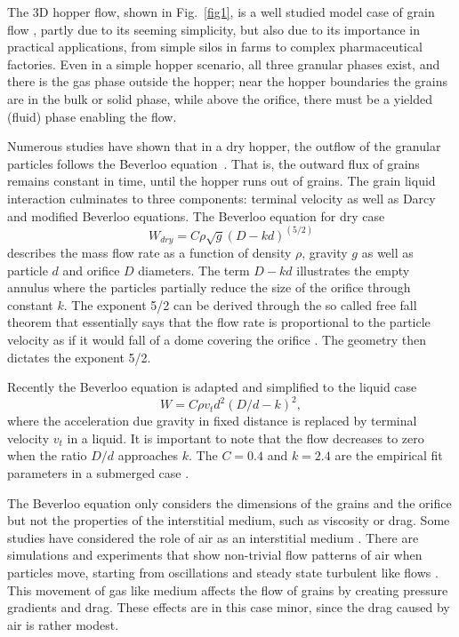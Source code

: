 \documentclass[twoside,twocolumn,9pt]{article}
\begin{document}
The 3D hopper flow, shown in Fig.~\ref{fig1}, is a well studied model case of grain flow \cite{Thomas2016,Wilson2014,Thomas2015}, partly due to its seeming simplicity, but also due to its importance in practical applications, from simple silos in farms to complex pharmaceutical factories. Even in a simple hopper scenario, all three granular phases exist, and there is the gas phase outside the hopper; near the hopper boundaries the grains are in the bulk or solid phase, while above the orifice, there must be a yielded (fluid) phase enabling the flow.


Numerous studies have shown that in a dry hopper, the outflow 
of the granular particles follows the Beverloo equation~\cite{Beverloo1961,Madrid2016Arx,AshourSM17}. 
That is, the outward flux of 
grains remains constant in time, until the hopper runs out of grains.
The grain liquid interaction culminates to three components: terminal velocity as well as Darcy and modified Beverloo equations. The Beverloo equation for dry case 
%
\begin{equation}
W_{dry} = C \rho \sqrt{g}(D-kd)^{(5/2)}
\end{equation}
%
describes the mass flow rate as a function of density $\rho$, gravity $g$ as well as particle $d$ and orifice $D$ diameters. 
The term $D-kd$ illustrates the empty annulus where the particles partially reduce the size of the orifice through constant $k$. 
The exponent 5/2 can be derived through the so called free fall theorem 
that essentially says that the flow rate is proportional to the particle 
velocity as if it would fall of a dome covering the orifice 
\cite{Tian2015,Janda2012,Mankoc2007}. 
The geometry then dictates the exponent 5/2.

Recently the Beverloo equation is adapted and simplified to the liquid case \cite{Wilson2014} 
%
\begin{equation}
	W = C\rho v_t d^2 (D/d - k)^2, \label{eq:modified-beverloo}
\end{equation}   
%
\noindent where the acceleration due gravity in fixed distance is replaced by terminal velocity $v_t$ in a liquid. It is important to note that the flow decreases to zero when the ratio $D/d$ approaches $k$. The $C=0.4$ and $k=2.4$ are the empirical fit parameters in a submerged case \cite{Wilson2014,koivistoSubmitted}.

The Beverloo equation only considers the dimensions of the grains and the 
orifice but not the properties of the interstitial medium, such as viscosity or drag.
Some studies have considered the role of air as an interstitial 
medium \cite{Yuu2011Mat}. There are simulations and experiments that 
show non-trivial flow patterns of air when particles move, starting 
from oscillations \cite{WuX.L.Maloy1993,Bertho2002} and steady state 
turbulent like flows \cite{Hilton2011}. This movement of gas like 
medium affects the flow of grains by creating pressure gradients and 
drag. 
These effects are in this case minor, since the drag caused
by air is rather modest.
\end{document}
